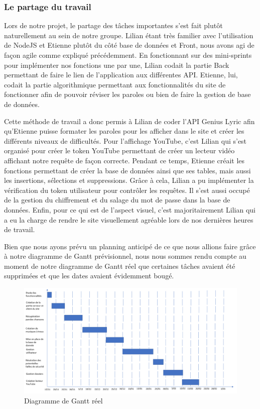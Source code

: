 \documentclass[12pt,french]{article}
\begin{document}
\subsubsection{Le partage du travail} 

Lors de notre projet, le partage des tâches importantes s'est fait plutôt naturellement au sein de notre groupe. Lilian étant très familier avec l'utilisation de NodeJS et Etienne plutôt du côté base de données et \gls{Front}, nous avons agi de façon agile comme expliqué précédemment. En fonctionnant sur des mini-\gls{sprint}s pour implémenter nos fonctions une par une, Lilian codait la partie \gls{Back} permettant de faire le lien de l'application aux différentes \gls{API}. Etienne, lui, codait la partie algorithmique permettant aux fonctionnalités du site de fonctionner afin de pouvoir réviser les paroles ou bien de faire la gestion de base de données.
\newline


Cette méthode de travail a donc permis à Lilian de coder l'\gls{API} Genius Lyric afin qu'Etienne puisse formater les paroles pour les afficher dans le site et créer les différents niveaux de difficultés. Pour l'affichage YouTube, c'est Lilian qui s'est organisé pour créer le \gls{token} YouTube permettant de créer un lecteur vidéo affichant notre requête de façon correcte. Pendant ce temps, Etienne créait les fonctions permettant de créer la base de données ainsi que ses \gls{table}s, mais aussi les insertions, sélections et suppressions. Grâce à cela, Lilian a pu implémenter la vérification du \gls{token} utilisateur pour contrôler les requêtes. Il s'est aussi occupé de la gestion du chiffrement et du salage du mot de passe dans la base de données. Enfin, pour ce qui est de l'aspect visuel, c'est majoritairement Lilian qui a eu la charge de rendre le site visuellement agréable lors de nos dernières heures de travail.
\newline   

Bien que nous ayons prévu un planning anticipé de ce que nous allions faire grâce à notre diagramme de Gantt prévisionnel, nous nous sommes rendu compte au moment de notre diagramme de Gantt réel que certaines tâches avaient été supprimées et que les dates avaient évidemment bougé.

\begin{figure}[H]
	\centering
	\includegraphics[scale=0.5]{ganttreel.png}
	\caption{Diagramme de Gantt réel}    
\end{figure}
\end{document}
